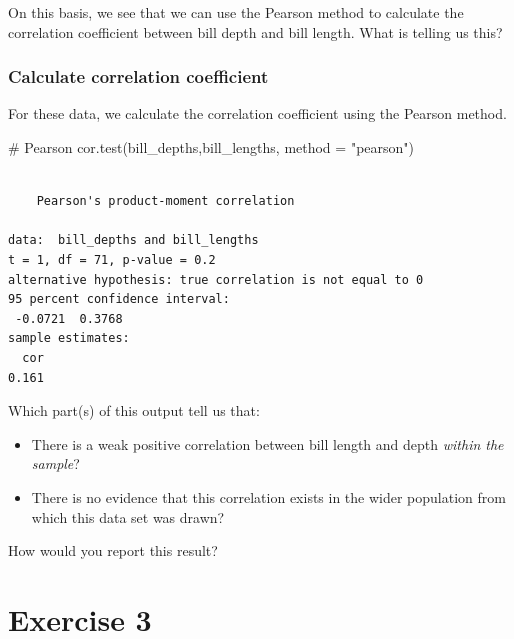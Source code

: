 \documentclass[
  letterpaper,
  DIV=11,
  numbers=noendperiod]{scrreprt}
\newenvironment{Shaded}{\begin{snugshade}}{\end{snugshade}}
\newcommand{\AttributeTok}[1]{\textcolor[rgb]{0.40,0.45,0.13}{#1}}
\newcommand{\CommentTok}[1]{\textcolor[rgb]{0.37,0.37,0.37}{#1}}
\newcommand{\FunctionTok}[1]{\textcolor[rgb]{0.28,0.35,0.67}{#1}}
\newcommand{\NormalTok}[1]{\textcolor[rgb]{0.00,0.23,0.31}{#1}}
\newcommand{\StringTok}[1]{\textcolor[rgb]{0.13,0.47,0.30}{#1}}
\providecommand{\tightlist}{%
  \setlength{\itemsep}{0pt}\setlength{\parskip}{0pt}}\usepackage{longtable,booktabs,array}
\begin{document}
On this basis, we see that we can use the Pearson method to calculate
the correlation coefficient between bill depth and bill length. What is
telling us this?

\subsubsection{Calculate correlation
coefficient}\label{calculate-correlation-coefficient}

For these data, we calculate the correlation coefficient using the
Pearson method.

\begin{Shaded}
\begin{Highlighting}[]
\CommentTok{\# Pearson}
\FunctionTok{cor.test}\NormalTok{(bill\_depths,bill\_lengths, }\AttributeTok{method =} \StringTok{"pearson"}\NormalTok{)}
\end{Highlighting}
\end{Shaded}

\begin{verbatim}

    Pearson's product-moment correlation

data:  bill_depths and bill_lengths
t = 1, df = 71, p-value = 0.2
alternative hypothesis: true correlation is not equal to 0
95 percent confidence interval:
 -0.0721  0.3768
sample estimates:
  cor 
0.161 
\end{verbatim}

Which part(s) of this output tell us that:

\begin{itemize}
\tightlist
\item
  There is a weak positive correlation between bill length and depth
  \emph{within the sample}?
\item
  There is no evidence that this correlation exists in the wider
  population from which this data set was drawn?
\end{itemize}

How would you report this result?

\section{Exercise 3}\label{exercise-3}
\end{document}
